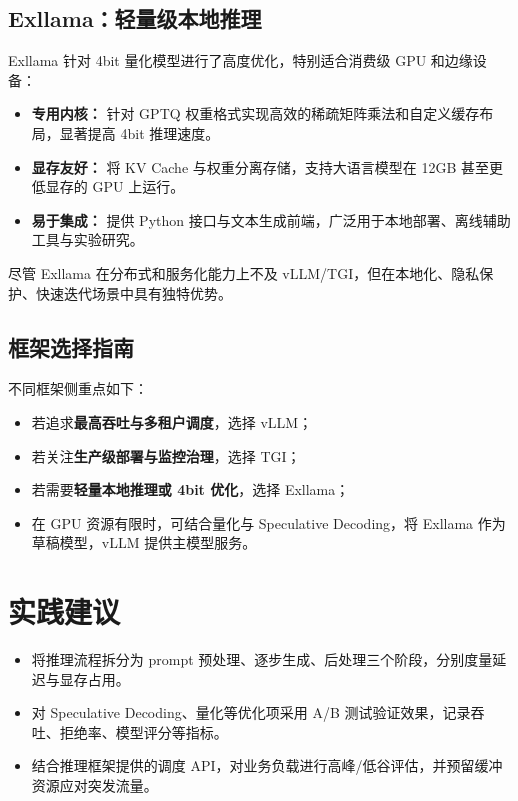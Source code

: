 \documentclass[UTF8,zihao=-4]{ctexart}
\begin{document}
\subsection{Exllama：轻量级本地推理}
Exllama 针对 4bit 量化模型进行了高度优化，特别适合消费级 GPU 和边缘设备：
\begin{itemize}
  \item \textbf{专用内核：} 针对 GPTQ 权重格式实现高效的稀疏矩阵乘法和自定义缓存布局，显著提高 4bit 推理速度。
  \item \textbf{显存友好：} 将 KV Cache 与权重分离存储，支持大语言模型在 12GB 甚至更低显存的 GPU 上运行。
  \item \textbf{易于集成：} 提供 Python 接口与文本生成前端，广泛用于本地部署、离线辅助工具与实验研究。
\end{itemize}
尽管 Exllama 在分布式和服务化能力上不及 vLLM/TGI，但在本地化、隐私保护、快速迭代场景中具有独特优势。

\subsection{框架选择指南}
不同框架侧重点如下：
\begin{itemize}
  \item 若追求\textbf{最高吞吐与多租户调度}，选择 vLLM；
  \item 若关注\textbf{生产级部署与监控治理}，选择 TGI；
  \item 若需要\textbf{轻量本地推理或 4bit 优化}，选择 Exllama；
  \item 在 GPU 资源有限时，可结合量化与 Speculative Decoding，将 Exllama 作为草稿模型，vLLM 提供主模型服务。
\end{itemize}

\section*{实践建议}
\begin{itemize}
  \item 将推理流程拆分为 prompt 预处理、逐步生成、后处理三个阶段，分别度量延迟与显存占用。
  \item 对 Speculative Decoding、量化等优化项采用 A/B 测试验证效果，记录吞吐、拒绝率、模型评分等指标。
  \item 结合推理框架提供的调度 API，对业务负载进行高峰/低谷评估，并预留缓冲资源应对突发流量。
\end{itemize}
\end{document}
